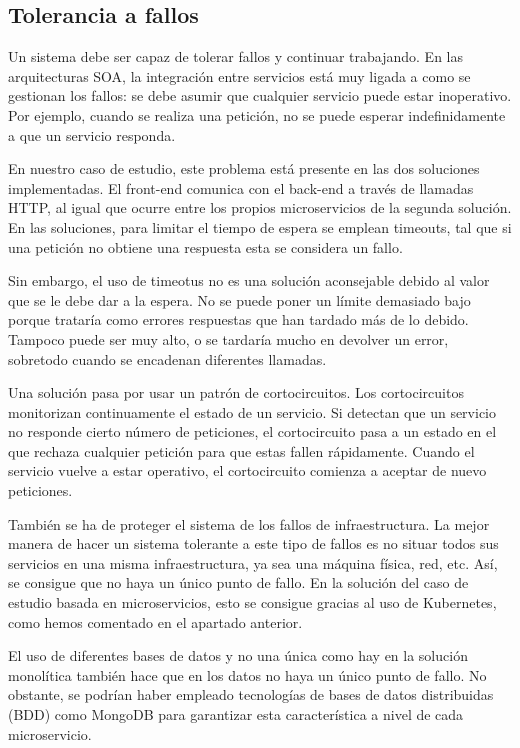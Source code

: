 \documentclass[11pt,spanish,listoffigures]{tfgetsinf}
\begin{document}
\subsection{Tolerancia a fallos}

Un sistema debe ser capaz de tolerar fallos y continuar trabajando. En las arquitecturas SOA, la integración entre servicios está muy ligada a como se gestionan los fallos: se debe asumir que cualquier servicio puede estar inoperativo. Por ejemplo, cuando se realiza una petición, no se puede esperar indefinidamente a que un servicio responda. \cite{Newman2015a}

En nuestro caso de estudio, este problema está presente en las dos soluciones implementadas. El front-end comunica con el back-end a través de llamadas HTTP, al igual que ocurre entre los propios microservicios de la segunda solución. En las soluciones, para limitar el tiempo de espera se emplean timeouts, tal que si una petición no obtiene una respuesta esta se considera un fallo.

Sin embargo, el uso de timeotus no es una solución aconsejable debido al valor que se le debe dar a la espera. No se puede poner un límite demasiado bajo porque trataría como errores respuestas que han tardado más de lo debido. Tampoco puede ser muy alto, o se tardaría mucho en devolver un error, sobretodo cuando se encadenan diferentes llamadas.

Una solución pasa por usar un patrón de cortocircuitos. Los cortocircuitos monitorizan continuamente el estado de un servicio. Si detectan que un servicio no responde cierto número de peticiones, el cortocircuito pasa a un estado en el que rechaza cualquier petición para que estas fallen rápidamente. Cuando el servicio vuelve a estar operativo, el cortocircuito comienza a aceptar de nuevo peticiones. \cite{Richards2016}

También se ha de proteger el sistema de los fallos de infraestructura. La mejor manera de hacer un sistema tolerante a este tipo de fallos es no situar todos sus servicios en una misma infraestructura, ya sea una máquina física, red, etc. Así, se consigue que no haya un único punto de fallo. \cite{Newman2015a} En la solución del caso de estudio basada en microservicios, esto se consigue gracias al uso de Kubernetes, como hemos comentado en el apartado anterior.

El uso de diferentes bases de datos y no una única como hay en la solución monolítica también hace que en los datos no haya un único punto de fallo. No obstante, se podrían haber empleado tecnologías de bases de datos distribuidas (BDD) como MongoDB para garantizar esta característica a nivel de cada microservicio.
\end{document}

